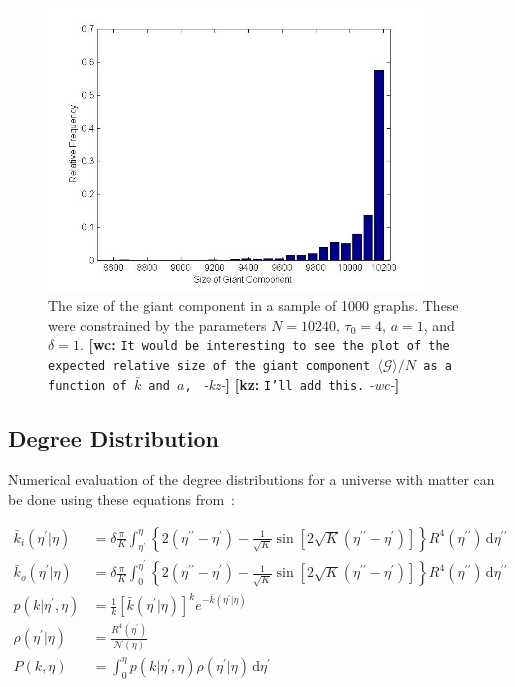 \documentclass[preprint,notitlepage,amsmath,amssymb,floatfix]{revtex4-1}
\newcommand{\XXX}[3]{{\bf [#1: } {\tt #3} {\it -#2-}{\bf ]}}
\begin{document}
\begin{figure}
\includegraphics[width=10cm]{figures/Giant_Component.jpg}
\caption{The size of the giant component in a sample of 1000 graphs.  These were constrained by the parameters $N = 10240$, $\tau_0 = 4$, $a = 1$, and $\delta = 1$. \XXX{wc}{kz}{It would be interesting to see the plot of the expected relative size of the giant component $\langle\mathcal{G}\rangle/N$ as a function of $\bar{k}$ and $a$, } \XXX{kz}{wc}{I'll add this.}}
\label{fig:size_gcc_uni}
\centering
\end{figure}

\subsection{Degree Distribution}
Numerical evaluation of the degree distributions for a universe with matter can be done using these equations from~\cite{ref:snc2012}:

\begin{align}
\bar{k}_i\left(\eta^\prime|\eta\right) &= \delta\frac{\pi}{K}\int_{\eta^\prime}^\eta\!\left\{2\left(\eta^{\prime\prime} - \eta^{\prime}\right) - \frac{1}{\sqrt{K}}\sin\left[2\sqrt{K}\left(\eta^{\prime\prime} - \eta^{\prime}\right)\right]\right\}R^4\left(\eta^{\prime\prime}\right)\, \mathrm d\eta^{\prime\prime} \\
\bar{k}_o\left(\eta^\prime|\eta\right) &= \delta\frac{\pi}{K}\int_0^{\eta^\prime}\!\left\{2\left(\eta^{\prime\prime} - \eta^{\prime}\right) - \frac{1}{\sqrt{K}}\sin\left[2\sqrt{K}\left(\eta^{\prime\prime} - \eta^{\prime}\right)\right]\right\}R^4\left(\eta^{\prime\prime}\right)\, \mathrm d\eta^{\prime\prime} \\
p\left(k|\eta^\prime,\eta\right) &= \frac{1}{k\!}\left[\bar{k} \left(\eta^\prime|\eta\right)\right]^k e^{-\bar{k} \left(\eta^\prime|\eta\right)} \\
\rho\left(\eta^\prime|\eta\right) &= \frac{R^4\left(\eta^\prime\right)}{\mathcal N \left(\eta\right)} \\
P\left(k,\eta\right) &= \int_0^\eta\! p\left(k|\eta^\prime,\eta\right)\rho\left(\eta^\prime|\eta\right)\,\mathrm d\eta^\prime
\end{align}
\end{document}
